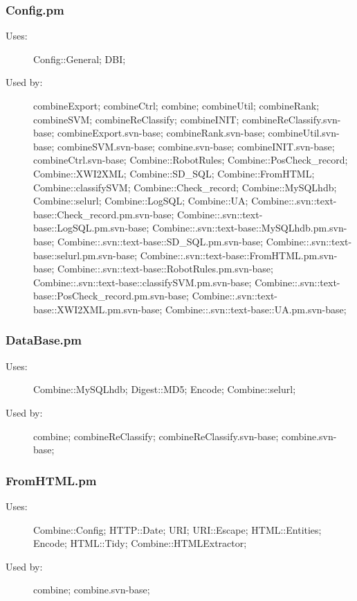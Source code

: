 \subsubsection{Config.pm}
\begin{description}
\item[Uses:] Config::General; DBI; 

\item[Used by:] combineExport; combineCtrl; combine; combineUtil; combineRank; combineSVM; combineReClassify; combineINIT; combineReClassify.svn-base; combineExport.svn-base; combineRank.svn-base; combineUtil.svn-base; combineSVM.svn-base; combine.svn-base; combineINIT.svn-base; combineCtrl.svn-base; Combine::RobotRules; Combine::PosCheck\_record; Combine::XWI2XML; Combine::SD\_SQL; Combine::FromHTML; Combine::classifySVM; Combine::Check\_record; Combine::MySQLhdb; Combine::selurl; Combine::LogSQL; Combine::UA; Combine::.svn::text-base::Check\_record.pm.svn-base; Combine::.svn::text-base::LogSQL.pm.svn-base; Combine::.svn::text-base::MySQLhdb.pm.svn-base; Combine::.svn::text-base::SD\_SQL.pm.svn-base; Combine::.svn::text-base::selurl.pm.svn-base; Combine::.svn::text-base::FromHTML.pm.svn-base; Combine::.svn::text-base::RobotRules.pm.svn-base; Combine::.svn::text-base::classifySVM.pm.svn-base; Combine::.svn::text-base::PosCheck\_record.pm.svn-base; Combine::.svn::text-base::XWI2XML.pm.svn-base; Combine::.svn::text-base::UA.pm.svn-base; 

\end{description}
\subsubsection{DataBase.pm}
\begin{description}
\item[Uses:] Combine::MySQLhdb; Digest::MD5; Encode; Combine::selurl; 

\item[Used by:] combine; combineReClassify; combineReClassify.svn-base; combine.svn-base; 

\end{description}
\subsubsection{FromHTML.pm}
\begin{description}
\item[Uses:] Combine::Config; HTTP::Date; URI; URI::Escape; HTML::Entities; Encode; HTML::Tidy; Combine::HTMLExtractor; 

\item[Used by:] combine; combine.svn-base; 

\end{description}

